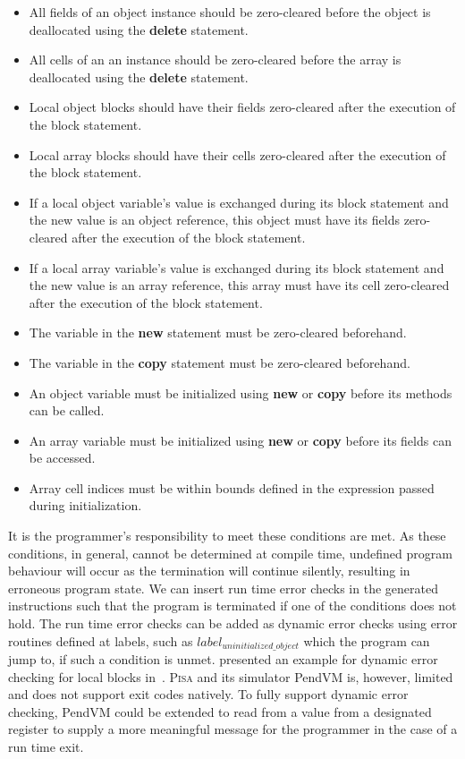 \begin{itemize}
    \item All fields of an object instance should be zero-cleared before the object is deallocated using the \textbf{delete} statement.
    \item All cells of an an instance should be zero-cleared before the array is deallocated using the \textbf{delete} statement.
    \item Local object blocks should have their fields zero-cleared after the execution of the block statement.
    \item Local array blocks should have their cells zero-cleared after the execution of the block statement.
    \item If a local object variable's value is exchanged during its block statement and the new value is an object reference, this object must have its fields zero-cleared after the execution of the block statement.
    \item If a local array variable's value is exchanged during its block statement and the new value is an array reference, this array must have its cell zero-cleared after the execution of the block statement.
    \item The variable in the \textbf{new} statement must be zero-cleared beforehand.
    \item The variable in the \textbf{copy} statement must be zero-cleared beforehand.
    \item An object variable must be initialized using \textbf{new} or \textbf{copy} before its methods can be called.
    \item An array variable must be initialized using \textbf{new} or \textbf{copy} before its fields can be accessed.
    \item Array cell indices must be within bounds defined in the expression passed during initialization. 
\end{itemize}

It is the programmer's responsibility to meet these conditions are met. As these conditions, in general, cannot be determined at compile time, undefined program behaviour will occur as the termination will continue silently, resulting in erroneous program state. We can insert run time error checks in the generated instructions such that the program is terminated if one of the conditions does not hold. The run time error checks can be added as dynamic error checks using error routines defined at labels, such as $label_{uninitialized\_object}$ which the program can jump to, if such a condition is unmet. \citeauthor{th:roopl} presented an example for dynamic error checking for local blocks in~\cite{th:roopl}. \textsc{Pisa} and its simulator PendVM is, however, limited and does not support exit codes natively. To fully support dynamic error checking, PendVM could be extended to read from a value from a designated register to supply a more meaningful message for the programmer in the case of a run time exit.

